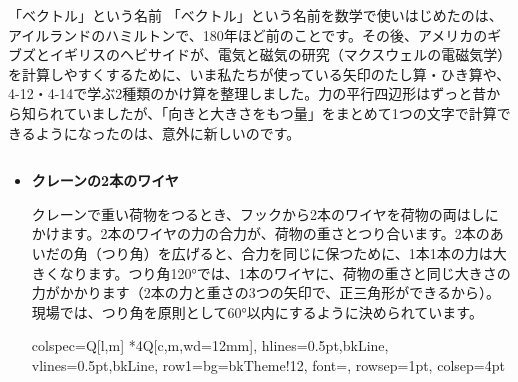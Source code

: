 \begin{column}{「ベクトル」という名前}
「ベクトル」という名前を数学で使いはじめたのは、アイルランドのハミルトンで、180年ほど前のことです。その後、アメリカのギブズとイギリスのヘビサイドが、電気と磁気の研究（マクスウェルの電磁気学）を計算しやすくするために、いま私たちが使っている矢印のたし算・ひき算や、4-12・4-14で学ぶ2種類のかけ算を整理しました。力の平行四辺形はずっと昔から知られていましたが、「向きと大きさをもつ量」をまとめて1つの文字で計算できるようになったのは、意外に新しいのです。
\end{column}

\begin{butsuri}
\begin{itemize}[leftmargin=1.2\zw, itemsep=2pt, topsep=0pt, label={\color{bkPurple}●}]
\item \textbf{クレーンの2本のワイヤ}\par
\noindent\begin{minipage}[c]{0.62\linewidth}
クレーンで重い荷物をつるとき、フックから2本のワイヤを荷物の両はしにかけます。2本のワイヤの力の合力が、荷物の重さとつり合います。2本のあいだの角（つり角）を広げると、合力を同じに保つために、1本1本の力は大きくなります。つり角120°では、1本のワイヤに、荷物の重さと同じ大きさの力がかかります（2本の力と重さの3つの矢印で、正三角形ができるから）。現場では、つり角を原則として60°以内にするように決められています。
\end{minipage}\hfill
\begin{minipage}[c]{0.34\linewidth}\centering
{}
\end{minipage}
\par\vspace{2pt}
{\centering\small
\begin{tblr}{colspec={Q[l,m] *{4}{Q[c,m,wd=12mm]}}, hlines={0.5pt,bkLine}, vlines={0.5pt,bkLine}, row{1}={bg=bkTheme!12, font=\sffamily\small}, rowsep=1pt, colsep=4pt}

\end{tblr}}
\end{itemize}
\end{butsuri}
